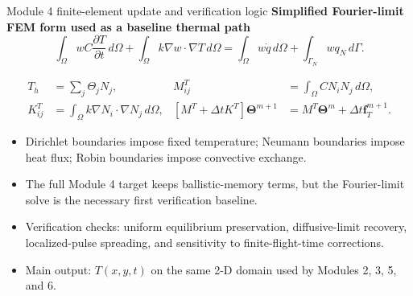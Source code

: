 \documentclass[aspectratio=169,10pt]{beamer}
\begin{document}
\begin{frame}{Module 4 finite-element update and verification logic}
\footnotesize
\textbf{Simplified Fourier-limit FEM form used as a baseline thermal path}
\vspace{-0.25em}
\begin{equation*}
\int_{\Omega}w C\frac{\partial T}{\partial t}\,d\Omega
+\int_{\Omega}k\nabla w\cdot\nabla T\,d\Omega
=\int_{\Omega}w\dot q\,d\Omega+\int_{\Gamma_N}wq_N\,d\Gamma.
\end{equation*}

\vspace{-0.4em}
\begin{align*}
T_h&=\sum_j\Theta_j N_j, &
M^T_{ij}&=\int_{\Omega} C N_iN_j\,d\Omega,\\[-0.15em]
K^T_{ij}&=\int_{\Omega} k\nabla N_i\cdot\nabla N_j\,d\Omega, &
\left[M^T+\Delta t K^T\right]\bm\Theta^{m+1}
&=M^T\bm\Theta^m+\Delta t\bm f_T^{m+1}.
\end{align*}

\vspace{-0.3em}
\begin{itemize}
    \item Dirichlet boundaries impose fixed temperature; Neumann boundaries impose heat flux; Robin boundaries impose convective exchange.
    \item The full Module 4 target keeps ballistic-memory terms, but the Fourier-limit solve is the necessary first verification baseline.
    \item Verification checks: uniform equilibrium preservation, diffusive-limit recovery, localized-pulse spreading, and sensitivity to finite-flight-time corrections.
    \item Main output: $T(x,y,t)$ on the same 2-D domain used by Modules 2, 3, 5, and 6.
\end{itemize}
\end{frame}
\end{document}
